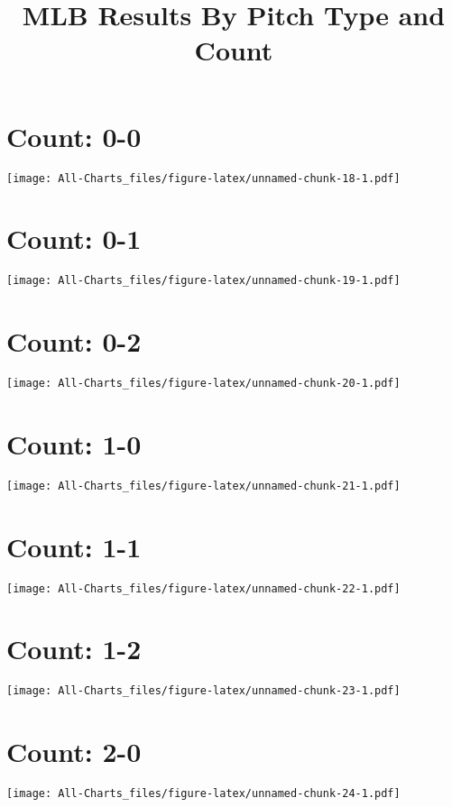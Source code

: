 \documentclass[]{article}
\title{MLB Results By Pitch Type and Count}
\date{}
\begin{document}
\maketitle

\section{Count: 0-0}\label{count-0-0}

\texttt{[image: All-Charts\_files/figure-latex/unnamed-chunk-18-1.pdf]}

\section{Count: 0-1}\label{count-0-1}

\texttt{[image: All-Charts\_files/figure-latex/unnamed-chunk-19-1.pdf]}

\section{Count: 0-2}\label{count-0-2}

\texttt{[image: All-Charts\_files/figure-latex/unnamed-chunk-20-1.pdf]}

\section{Count: 1-0}\label{count-1-0}

\texttt{[image: All-Charts\_files/figure-latex/unnamed-chunk-21-1.pdf]}

\section{Count: 1-1}\label{count-1-1}

\texttt{[image: All-Charts\_files/figure-latex/unnamed-chunk-22-1.pdf]}

\section{Count: 1-2}\label{count-1-2}

\texttt{[image: All-Charts\_files/figure-latex/unnamed-chunk-23-1.pdf]}

\section{Count: 2-0}\label{count-2-0}

\texttt{[image: All-Charts\_files/figure-latex/unnamed-chunk-24-1.pdf]}
\end{document}
